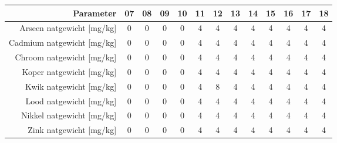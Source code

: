 \begin{tabular}{ r |c | c | c | c | c |c | c | c | c | c | c | c } 
\rowcolor[HTML]{EFEFEF}  
 Parameter & 07 & 08 & 09 & 10 & 11 & 12 & 13 & 14 & 15 & 16 & 17 & 18 \\    \hline     
Arseen natgewicht [mg/kg] &0 & 0 & 0 & 0 & 4 & 4 & 4 & 4 & 4 & 4 & 4 & 4 \\
Cadmium natgewicht [mg/kg] &0 & 0 & 0 & 0 & 4 & 4 & 4 & 4 & 4 & 4 & 4 & 4 \\
Chroom natgewicht [mg/kg] &0 & 0 & 0 & 0 & 4 & 4 & 4 & 4 & 4 & 4 & 4 & 4 \\
Koper natgewicht [mg/kg] &0 & 0 & 0 & 0 & 4 & 4 & 4 & 4 & 4 & 4 & 4 & 4 \\
Kwik natgewicht [mg/kg] &0 & 0 & 0 & 0 & 4 & 8 & 4 & 4 & 4 & 4 & 4 & 4 \\
Lood natgewicht [mg/kg] &0 & 0 & 0 & 0 & 4 & 4 & 4 & 4 & 4 & 4 & 4 & 4 \\
Nikkel natgewicht [mg/kg] &0 & 0 & 0 & 0 & 4 & 4 & 4 & 4 & 4 & 4 & 4 & 4 \\
Zink natgewicht [mg/kg] &0 & 0 & 0 & 0 & 4 & 4 & 4 & 4 & 4 & 4 & 4 & 4 \\
\end{tabular}    
